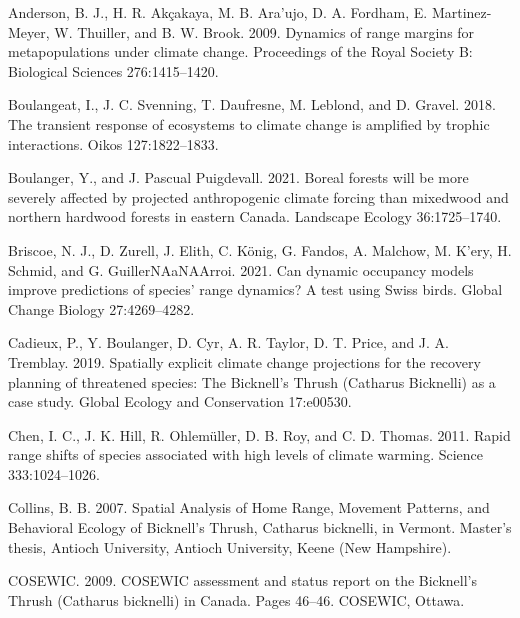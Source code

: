 \documentclass[12pt]{article}
\newlength{\cslhangindent}
\newenvironment{cslreferences}%
  {\setlength{\parindent}{0pt}%
  \everypar{\setlength{\hangindent}{\cslhangindent}}\ignorespaces}%
  {\par}
\begin{document}
\hypertarget{refs}{}
\begin{cslreferences}
\leavevmode\hypertarget{ref-anderson_dynamics_2009}{}%
Anderson, B. J., H. R. Akçakaya, M. B. Ara\a'ujo, D. A. Fordham, E.
Martinez-Meyer, W. Thuiller, and B. W. Brook. 2009. Dynamics of range
margins for metapopulations under climate change. Proceedings of the
Royal Society B: Biological Sciences 276:1415--1420.

\leavevmode\hypertarget{ref-boulangeat_transient_2018}{}%
Boulangeat, I., J. C. Svenning, T. Daufresne, M. Leblond, and D. Gravel.
2018. The transient response of ecosystems to climate change is
amplified by trophic interactions. Oikos 127:1822--1833.

\leavevmode\hypertarget{ref-boulanger_boreal_2021}{}%
Boulanger, Y., and J. Pascual Puigdevall. 2021. Boreal forests will be
more severely affected by projected anthropogenic climate forcing than
mixedwood and northern hardwood forests in eastern Canada. Landscape
Ecology 36:1725--1740.

\leavevmode\hypertarget{ref-briscoe_can_2021}{}%
Briscoe, N. J., D. Zurell, J. Elith, C. König, G. Fandos, A. Malchow, M.
K\a'ery, H. Schmid, and G. GuillerNAaNAArroi. 2021. Can dynamic
occupancy models improve predictions of species' range dynamics? A test
using Swiss birds. Global Change Biology 27:4269--4282.

\leavevmode\hypertarget{ref-cadieux_spatially_2019}{}%
Cadieux, P., Y. Boulanger, D. Cyr, A. R. Taylor, D. T. Price, and J. A.
Tremblay. 2019. Spatially explicit climate change projections for the
recovery planning of threatened species: The Bicknell's Thrush (Catharus
Bicknelli) as a case study. Global Ecology and Conservation 17:e00530.

\leavevmode\hypertarget{ref-chen_rapid_2011}{}%
Chen, I. C., J. K. Hill, R. Ohlemüller, D. B. Roy, and C. D. Thomas.
2011. Rapid range shifts of species associated with high levels of
climate warming. Science 333:1024--1026.

\leavevmode\hypertarget{ref-collins_spatial_2007}{}%
Collins, B. B. 2007. Spatial Analysis of Home Range, Movement Patterns,
and Behavioral Ecology of Bicknell's Thrush, Catharus bicknelli, in
Vermont. Master's thesis, Antioch University, Antioch University, Keene
(New Hampshire).

\leavevmode\hypertarget{ref-cosewic_cosewic_2009}{}%
COSEWIC. 2009. COSEWIC assessment and status report on the Bicknell's
Thrush (Catharus bicknelli) in Canada. Pages 46--46. COSEWIC, Ottawa.


\end{cslreferences}
\end{document}
